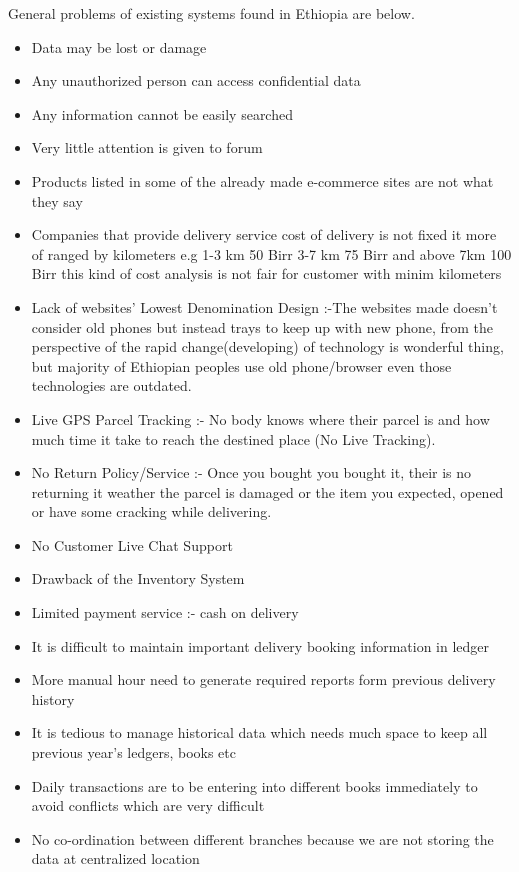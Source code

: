 General problems of existing systems found in Ethiopia are below.
\begin{itemize}
	\item Data may be lost or damage
	\item Any unauthorized person can access confidential data
	\item Any information cannot be easily searched
	\item Very little attention is given to forum 
	\item Products listed in some of the already made e-commerce sites are not what they say
	\item Companies that provide delivery service cost of delivery is not fixed it more of ranged by kilometers e.g 1-3 km 50 Birr 3-7 km 75 Birr and above 7km 100 Birr this kind of cost analysis  is not fair for customer with minim  kilometers
	\item Lack of websites' Lowest Denomination Design :-The websites made doesn't consider old phones but instead trays to keep up with new phone, from the perspective of the rapid change(developing) of technology is wonderful thing, but majority of Ethiopian peoples use old phone/browser even those technologies are outdated.
	\item Live GPS Parcel Tracking :- No body knows where their parcel is and how much time it take to reach the destined place (No Live Tracking).
	\item No Return Policy/Service :- Once you bought you bought it, their is no returning it weather the parcel is damaged or the item you expected, opened or have some cracking while delivering.
	\item No Customer Live Chat Support
	\item Drawback of the Inventory System
	\item Limited payment service :- cash on delivery
	\item It is difficult to maintain important delivery booking information in ledger
	\item More manual hour need to generate required reports form previous delivery history
	\item It is tedious to manage historical data which needs much space to keep all previous year's ledgers, books etc
	\item Daily transactions are to be entering into different books immediately to avoid conflicts which are very difficult
	\item No co-ordination between different branches because we are not storing the data at centralized location
\end{itemize}


